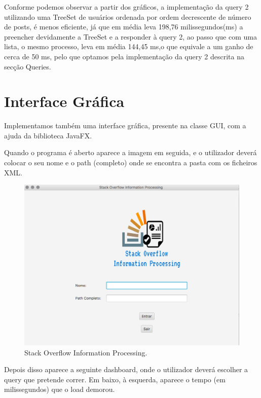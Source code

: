 \documentclass[a4paper]{article}
\begin{document}
    \vspace{0.4cm}

Conforme podemos observar a partir dos gráficos, a implementação da query 2 utilizando
uma TreeSet de usuários ordenada por ordem decrescente de número de posts,
é menos eficiente, já que em média leva 198,76 milissegundos(ms) a preencher
devidamente a TreeSet e a responder à query 2, ao passo que com uma lista,
o mesmo processo, leva em média 144,45 ms,o que equivale a um ganho de cerca de
50 ms, pelo que optamos pela implementação da query 2 descrita na secção Queries.


\section{Interface Gráfica}
\label{sec:interfacegrafica}

Implementamos também uma interface gráfica, presente na classe GUI,
com a ajuda da biblioteca JavaFX.

Quando o programa é aberto aparece a imagem em seguida, e o utilizador deverá
colocar o seu nome e o path (completo) onde se encontra a pasta com os ficheiros
XML.

\begin{figure}[H]
\centering
\includegraphics[scale=0.40]{imgs/inicio.png}
\caption{Stack Overflow Information Processing.}
\label{img:iniciolasdk}
\end{figure}

Depois disso aparece a seguinte dashboard, onde o utilizador deverá escolher
a query que pretende correr. Em baixo, à esquerda, aparece o tempo
(em milissegundos) que o load demorou.
\end{document}
